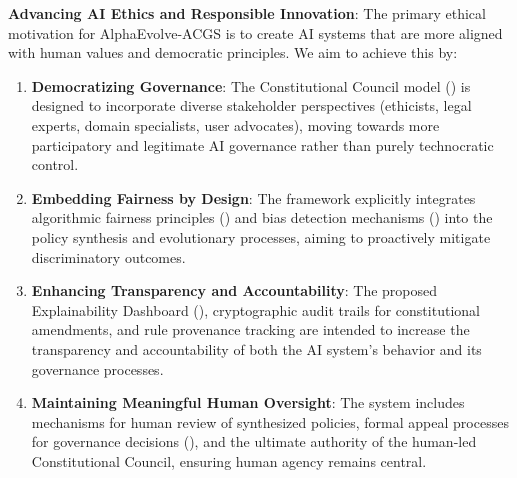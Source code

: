 \documentclass[manuscript,screen,review,anonymous,9pt]{acmart}
\begin{document}
\textbf{Advancing AI Ethics and Responsible Innovation}:
The primary ethical motivation for AlphaEvolve-ACGS is to create AI systems that are more aligned with human values and democratic principles. We aim to achieve this by:
\begin{enumerate}[leftmargin=*,itemsep=1pt,parsep=1pt]
    \item \textbf{Democratizing Governance}: The Constitutional Council model () is designed to incorporate diverse stakeholder perspectives (ethicists, legal experts, domain specialists, user advocates), moving towards more participatory and legitimate AI governance rather than purely technocratic control.
    \item \textbf{Embedding Fairness by Design}: The framework explicitly integrates algorithmic fairness principles () and bias detection mechanisms () into the policy synthesis and evolutionary processes, aiming to proactively mitigate discriminatory outcomes.
    \item \textbf{Enhancing Transparency and Accountability}: The proposed Explainability Dashboard (), cryptographic audit trails for constitutional amendments, and rule provenance tracking are intended to increase the transparency and accountability of both the AI system's behavior and its governance processes.
    \item \textbf{Maintaining Meaningful Human Oversight}: The system includes mechanisms for human review of synthesized policies, formal appeal processes for governance decisions (), and the ultimate authority of the human-led Constitutional Council, ensuring human agency remains central.
\end{enumerate}
\end{document}

